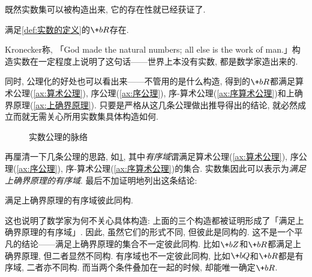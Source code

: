 \documentclass[hidelinks]{ctexart}
\begin{document}
既然实数集可以被构造出来, 它的存在性就已经获证了.
\begin{finale}
    \begin{theorem}[实数集存在]
        满足\cref{def:实数的定义}的$\+bR$存在.
    \end{theorem}
\end{finale}
\begin{remark}
    Kronecker称, 「God made the natural numbers; all else is the work of man.」构造实数在一定程度上说明了这句话——世界上本没有实数, 都是数学家造出来的.
\end{remark}
同时, 公理化的好处也可以看出来——不管用的是什么构造, 得到的$\+bR$都满足算术公理(\cref{ax:算术公理}), 序公理(\cref{ax:序公理}), 序-算术公理(\cref{ax:序算术公理})和上确界原理(\cref{ax:上确界原理}). 只要是严格从这几条公理做出推导得出的结论, 就必然成立而就无需关心所用实数集具体构造如何.
\par
\begin{figure}[ht]
\centering
\centerline{
}
\caption{实数公理的脉络}
\label{fig:实数公理的脉络}
\end{figure}

再厘清一下几条公理的思路, 如\cref{fig:实数公理的脉络}, 其中\emph{有序域}谓满足算术公理(\cref{ax:算术公理}), 序公理(\cref{ax:序公理}), 序-算术公理(\cref{ax:序算术公理})的集合. 实数集因此可以表示为\emph{满足上确界原理的有序域}. 最后不加证明地列出这条结论:
\begin{finale}
    \begin{theorem}[实数集的唯一性]
        满足上确界原理的有序域彼此同构.
    \end{theorem}
\end{finale}
这也说明了数学家为何不关心具体构造: 上面的三个构造都被证明形成了「满足上确界原理的有序域」. 因此, 虽然它们的形式不同, 但彼此是同构的. 这不是一个平凡的结论——满足上确界原理的集合不一定彼此同构. 比如$\+bZ$和$\+bR$都满足上确界原理, 但二者显然不同构. 有序域也不一定彼此同构, 比如$\+bQ$和$\+bR$都是有序域, 二者亦不同构. 而当两个条件叠加在一起的时候, 却能唯一确定$\+bR$.

\end{document}
